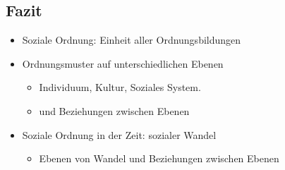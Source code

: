 \subsection{Fazit}
\begin{itemize}
	\item
		Soziale Ordnung: Einheit aller Ordnungsbildungen
	\item
		Ordnungsmuster auf unterschiedlichen Ebenen
		\begin{itemize}
			\item
				Individuum, Kultur, Soziales System.
			\item
				und Beziehungen zwischen Ebenen
		\end{itemize}
	\item
		Soziale Ordnung in der Zeit: sozialer Wandel
		\begin{itemize}
			\item
				Ebenen von Wandel und Beziehungen zwischen Ebenen
		\end{itemize}
\end{itemize}
